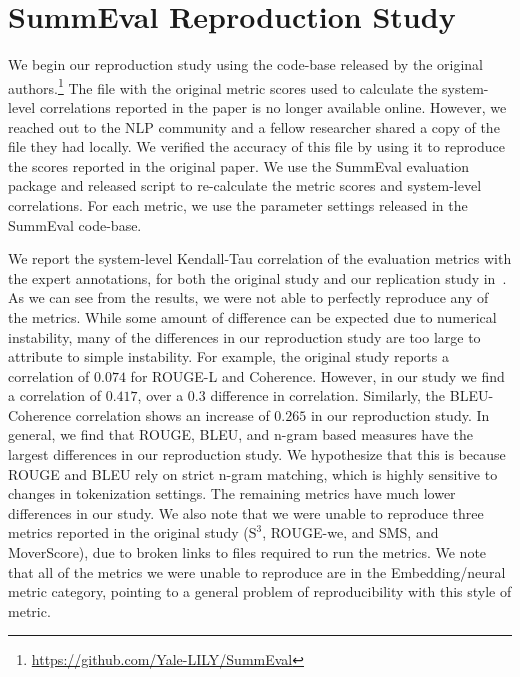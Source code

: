 \clearpage
\appendix



\section{SummEval Reproduction Study}\label{sec:6-appendix-summeval-repro}

We begin our reproduction study using the code-base released by the original authors.\footnote{\url{https://github.com/Yale-LILY/SummEval}} The file with the original metric scores used to calculate the system-level correlations reported in the paper is no longer available online. However, we reached out to the NLP community and a fellow researcher shared a copy of the file they had locally. We verified the accuracy of this file by using it to reproduce the scores reported in the original paper. We use the SummEval evaluation package and released script to re-calculate the metric scores and system-level correlations. For each metric, we use the parameter settings released in the SummEval code-base.

We report the system-level Kendall-Tau correlation of the evaluation metrics with the expert annotations, for both the original study and our replication study in~. As we can see from the results, we were not able to perfectly reproduce any of the metrics. While some amount of difference can be expected due to numerical instability, many of the differences in our reproduction study are too large to attribute to simple instability. For example, the original study reports a correlation of $0.074$ for ROUGE-L and Coherence. However, in our study we find a correlation of $0.417$, over a $0.3$ difference in correlation. Similarly, the BLEU-Coherence correlation shows an increase of $0.265$ in our reproduction study. In general, we find that ROUGE, BLEU, and n-gram based measures have the largest differences in our reproduction study. We hypothesize that this is because ROUGE and BLEU rely on strict n-gram matching, which is highly sensitive to changes in tokenization settings. The remaining metrics have much lower differences in our study. We also note that we were unable to reproduce three metrics reported in the original study ($\mathrm{S}^3$, ROUGE-we, and SMS, and MoverScore), due to broken links to files required to run the metrics. We note that all of the metrics we were unable to reproduce are in the Embedding/neural metric category, pointing to a general problem of reproducibility with this style of metric.


